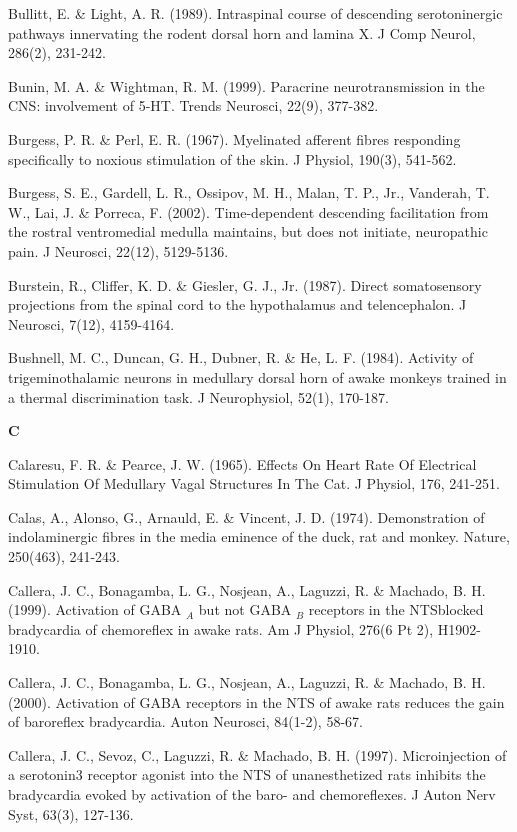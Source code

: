 \documentclass[a4paper,12pt,twoside]{report}
\begin{document}
\begin{singlespacing}
\begin{footnotesize}
Bullitt, E. \& Light, A. R. (1989). Intraspinal course of descending serotoninergic pathways innervating the rodent dorsal horn and lamina X. J Comp Neurol, 286(2), 231-242.

Bunin, M. A. \& Wightman, R. M. (1999). Paracrine neurotransmission in the CNS: involvement of 5-HT. Trends Neurosci, 22(9), 377-382.

Burgess, P. R. \& Perl, E. R. (1967). Myelinated afferent fibres responding specifically to noxious stimulation of the skin. J Physiol, 190(3), 541-562.

Burgess, S. E., Gardell, L. R., Ossipov, M. H., Malan, T. P., Jr., Vanderah, T. W., Lai, J. \& Porreca, F. (2002). Time-dependent descending facilitation from the rostral ventromedial medulla maintains, but does not initiate, neuropathic pain. J Neurosci, 22(12), 5129-5136.

Burstein, R., Cliffer, K. D. \& Giesler, G. J., Jr. (1987). Direct somatosensory projections from the spinal cord to the hypothalamus and telencephalon. J Neurosci, 7(12), 4159-4164.

Bushnell, M. C., Duncan, G. H., Dubner, R. \& He, L. F. (1984). Activity of trigeminothalamic neurons in medullary dorsal horn of awake monkeys trained in a thermal discrimination task. J Neurophysiol, 52(1), 170-187.

\medskip
\begin{Large}\textbf{C}\end{Large}

Calaresu, F. R. \& Pearce, J. W. (1965). Effects On Heart Rate Of Electrical Stimulation Of Medullary Vagal Structures In The Cat. J Physiol, 176, 241-251.

Calas, A., Alonso, G., Arnauld, E. \& Vincent, J. D. (1974). Demonstration of indolaminergic fibres in the media eminence of the duck, rat and monkey. Nature, 250(463), 241-243.

Callera, J. C., Bonagamba, L. G., Nosjean, A., Laguzzi, R. \& Machado, B. H. (1999). Activation of GABA $_{A}$ but not GABA $_{B}$ receptors in the NTSblocked bradycardia of chemoreflex in awake rats. Am J Physiol, 276(6 Pt 2), H1902-1910.

Callera, J. C., Bonagamba, L. G., Nosjean, A., Laguzzi, R. \& Machado, B. H. (2000). Activation of GABA receptors in the NTS of awake rats reduces the gain of baroreflex bradycardia. Auton Neurosci, 84(1-2), 58-67.

Callera, J. C., Sevoz, C., Laguzzi, R. \& Machado, B. H. (1997). Microinjection of a serotonin3 receptor agonist into the NTS of unanesthetized rats inhibits the bradycardia evoked by activation of the baro- and chemoreflexes. J Auton Nerv Syst, 63(3), 127-136.


\end{footnotesize}
\end{singlespacing}
\end{document}
